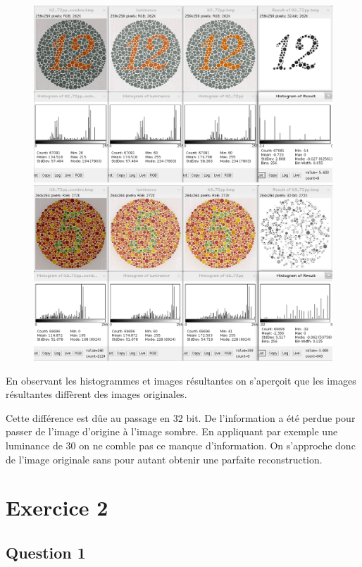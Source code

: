 \documentclass[a4paper,12pt]{report}
\begin{document}
\begin{figure}[!ht]
	\center	
	\includegraphics[scale=0.32]{image/q3-2.png}
	
	\includegraphics[scale=0.32]{image/q3-3.png}
\end{figure} 

En observant les histogrammes et images résultantes on s'aperçoit que les images résultantes diffèrent des images originales.

Cette différence est dûe au passage en 32 bit. De l'information a été perdue pour passer de l'image d'origine à l'image sombre. En appliquant par exemple une luminance de 30 on ne comble pas ce manque d'information. On s'approche donc de l'image originale sans pour autant obtenir une parfaite reconstruction.

\section*{Exercice 2}

\subsection*{Question 1}
\end{document}
